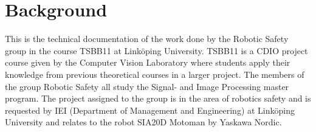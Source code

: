 \section{Background}
This is the technical documentation of the work done by the Robotic Safety group in the course TSBB11 at Linköping University. TSBB11 is a CDIO project course given by the Computer Vision Laboratory where students apply their knowledge from previous theoretical courses in a larger project. The members of the group Robotic Safety all study the Signal- and Image Processing master program. 
The project assigned to the group is in the area of robotics safety and is requested by IEI (Department of Management and Engineering) at Linköping University and relates to the robot SIA20D Motoman by Yaskawa Nordic. 